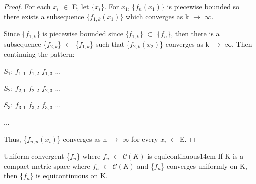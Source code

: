    \begin{proof}
        For each $x_i$ $\in$ E, let \{$x_i$\}.
        For $x_1$, \{$f_n(x_1)$\} is piecewise bounded so there exists a
        subsequence \{$f_{1,k}(x_1)$\} which converges as k $\rightarrow$ $\infty$.
        
        Since \{$f_{1,k}$\} is piecewise bounded since \{$f_{1,k}$\}
        $\subset$ \{$f_n$\}, then there is a subsequence
        \{$f_{2,k}$\} $\subset$ \{$f_{1,k}$\} such that \{$f_{2,k}(x_2)$\}
        converges as k $\rightarrow$ $\infty$.
        Then continuing the pattern:

        \hspace{0.5cm}
        $S_1$:
        \hspace{1cm}
        $f_{1,1}$
        \hspace{1cm}
        $f_{1,2}$
        \hspace{1cm}
        $f_{1,3}$
        \hspace{1cm}
        ...

        \hspace{0.5cm}
        $S_2$:
        \hspace{1cm}
        $f_{2,1}$
        \hspace{1cm}
        $f_{2,2}$
        \hspace{1cm}
        $f_{2,3}$
        \hspace{1cm}
        ...

        \hspace{0.5cm}
        $S_3$:
        \hspace{1cm}
        $f_{3,1}$
        \hspace{1cm}
        $f_{3,2}$
        \hspace{1cm}
        $f_{3,3}$
        \hspace{1cm}
        ...

        \hspace{0.5cm}
        ...
    
        Thus, \{$f_{n,n}(x_i)$\} converges as n $\rightarrow$ $\infty$ for
        every $x_i$ $\in$ E.
    \end{proof}

    \newpage



    \begin{wtheorem}{Uniform convergent \{$f_n$\} where $f_n$ $\in$ $\mathscr{C}(K)$
    is equicontinuous}{14cm}
        If K is a compact metric space where $f_n$ $\in$ $\mathscr{C}(K)$ and
        \{$f_n$\} converges uniformly on K, then \{$f_n$\} is equicontinuous on K.
    \end{wtheorem}

